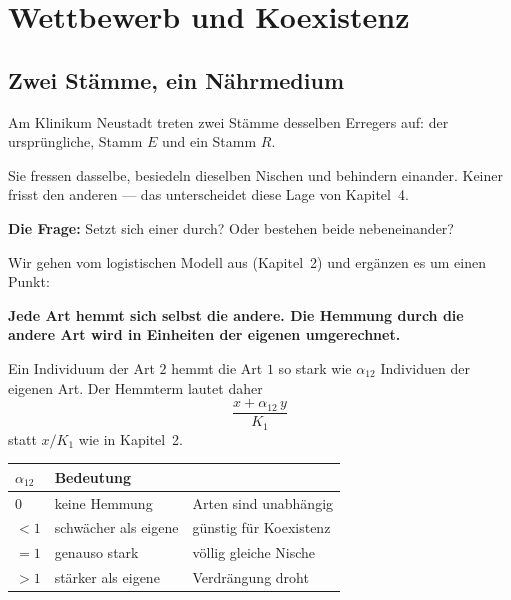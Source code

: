 \chapter{Wettbewerb und Koexistenz}

\section{Zwei Stämme, ein Nährmedium}

\begin{merksatz}
Am Klinikum Neustadt treten zwei Stämme desselben Erregers auf: der ursprüngliche,  Stamm $E$ und ein  Stamm $R$.

Sie fressen dasselbe, besiedeln dieselben Nischen und behindern einander. Keiner frisst den anderen --- das unterscheidet diese Lage von Kapitel~4.

\textbf{Die Frage:} Setzt sich einer durch? Oder bestehen beide nebeneinander?
\end{merksatz}

\begin{merksatz}
Wir gehen vom logistischen Modell aus (Kapitel~2) und ergänzen es um einen Punkt:

\begin{center}
\begin{minipage}{0.9\textwidth}
\textbf{Jede Art hemmt sich selbst  die andere. Die Hemmung durch die andere Art wird in Einheiten der eigenen umgerechnet.}
\end{minipage}
\end{center}

Ein Individuum der Art $2$ hemmt die Art $1$ so stark wie $\alpha_{12}$ Individuen der eigenen Art. Der Hemmterm lautet daher
\[ \frac{x + \alpha_{12}\,y}{K_1} \]
statt $x/K_1$ wie in Kapitel~2.

\begin{center}
\renewcommand{\arraystretch}{1.48}
\begin{tabular}{@{}P{2.2cm}P{2.8cm}P{3.0cm}@{}}
\toprule
$\alpha_{12}$ & \textbf{Bedeutung} & \\
\midrule
$0$ & keine Hemmung & Arten sind unabhängig\\
$<1$ & schwächer als eigene & \textcolor{gruen}{günstig für Koexistenz}\\
$=1$ & genauso stark & völlig gleiche Nische\\
$>1$ & stärker als eigene & \textcolor{akzent}{Verdrängung droht}\\
\bottomrule
\end{tabular}
\end{center}
\end{merksatz}

